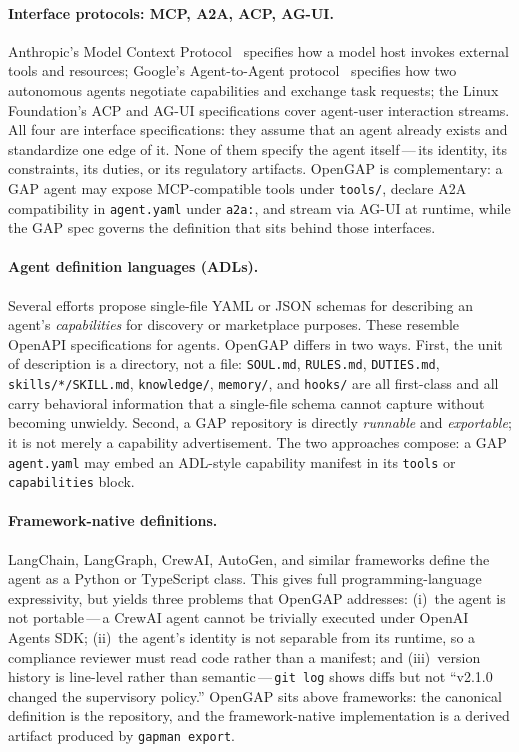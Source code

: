 \documentclass[11pt,a4paper]{article}
\begin{document}
\paragraph{Interface protocols: MCP, A2A, ACP, AG-UI.}
Anthropic's Model Context Protocol~\cite{mcp2024} specifies how a model host invokes
external tools and resources; Google's Agent-to-Agent protocol~\cite{a2a2024} specifies
how two autonomous agents negotiate capabilities and exchange task requests; the Linux
Foundation's ACP and AG-UI specifications cover agent-user interaction streams. All four
are interface specifications: they assume that an agent already exists and standardize
one edge of it. None of them specify the agent itself\,---\,its identity, its
constraints, its duties, or its regulatory artifacts. OpenGAP is complementary: a GAP
agent may expose MCP-compatible tools under \texttt{tools/}, declare A2A compatibility
in \texttt{agent.yaml} under \texttt{a2a:}, and stream via AG-UI at runtime, while the
GAP spec governs the definition that sits behind those interfaces.

\paragraph{Agent definition languages (ADLs).}
Several efforts propose single-file YAML or JSON schemas for describing an agent's
\emph{capabilities} for discovery or marketplace purposes. These resemble OpenAPI
specifications for agents. OpenGAP differs in two ways. First, the unit of description
is a directory, not a file: \texttt{SOUL.md}, \texttt{RULES.md}, \texttt{DUTIES.md},
\texttt{skills/*/SKILL.md}, \texttt{knowledge/}, \texttt{memory/}, and \texttt{hooks/}
are all first-class and all carry behavioral information that a single-file schema
cannot capture without becoming unwieldy. Second, a GAP repository is directly
\emph{runnable} and \emph{exportable}; it is not merely a capability advertisement.
The two approaches compose: a GAP \texttt{agent.yaml} may embed an ADL-style capability
manifest in its \texttt{tools} or \texttt{capabilities} block.

\paragraph{Framework-native definitions.}
LangChain, LangGraph, CrewAI, AutoGen, and similar frameworks define the agent as a
Python or TypeScript class. This gives full programming-language expressivity, but
yields three problems that OpenGAP addresses: (i)~the agent is not portable\,---\,a
CrewAI agent cannot be trivially executed under OpenAI Agents SDK; (ii)~the agent's
identity is not separable from its runtime, so a compliance reviewer must read code
rather than a manifest; and (iii)~version history is line-level rather than
semantic\,---\,\texttt{git log} shows diffs but not ``v2.1.0 changed the supervisory
policy.'' OpenGAP sits above frameworks: the canonical definition is the repository,
and the framework-native implementation is a derived artifact produced by
\texttt{gapman export}.
\end{document}
